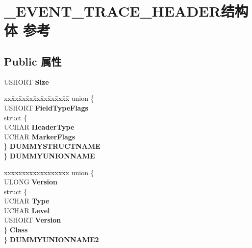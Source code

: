 \hypertarget{struct___e_v_e_n_t___t_r_a_c_e___h_e_a_d_e_r}{}\section{\+\_\+\+E\+V\+E\+N\+T\+\_\+\+T\+R\+A\+C\+E\+\_\+\+H\+E\+A\+D\+E\+R结构体 参考}
\label{struct___e_v_e_n_t___t_r_a_c_e___h_e_a_d_e_r}
\subsection*{Public 属性}
\begin{DoxyCompactItemize}
\item 
\mbox{\label{struct___e_v_e_n_t___t_r_a_c_e___h_e_a_d_e_r_a4dcda2e957981dd76032bc05da85e927}} 
U\+S\+H\+O\+RT {\bfseries Size}
\item 
\mbox{\label{struct___e_v_e_n_t___t_r_a_c_e___h_e_a_d_e_r_af05fd67d217dfa36fb33abedffdaf641}} 
\begin{tabbing}
xx\=xx\=xx\=xx\=xx\=xx\=xx\=xx\=xx\=\kill
union \{\\
\>USHORT {\bfseries FieldTypeFlags}\\
\>struct \{\\
\>\>UCHAR {\bfseries HeaderType}\\
\>\>UCHAR {\bfseries MarkerFlags}\\
\>\} {\bfseries DUMMYSTRUCTNAME}\\
\} {\bfseries DUMMYUNIONNAME}\\

\end{tabbing}\item 
\mbox{\label{struct___e_v_e_n_t___t_r_a_c_e___h_e_a_d_e_r_a765a8e709716d0d6a0c112c3be0be9b6}} 
\begin{tabbing}
xx\=xx\=xx\=xx\=xx\=xx\=xx\=xx\=xx\=\kill
union \{\\
\>ULONG {\bfseries Version}\\
\>struct \{\\
\>\>UCHAR {\bfseries Type}\\
\>\>UCHAR {\bfseries Level}\\
\>\>USHORT {\bfseries Version}\\
\>\} {\bfseries Class}\\
\} {\bfseries DUMMYUNIONNAME2}\\


\end{tabbing}
\end{DoxyCompactItemize}
